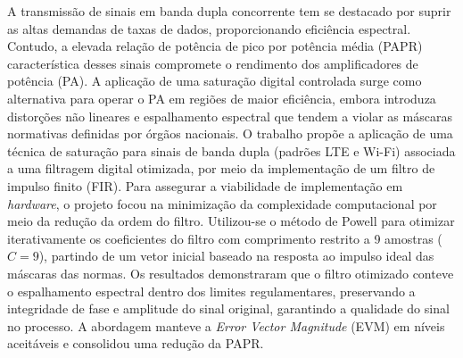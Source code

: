 A transmissão de sinais em banda dupla concorrente tem se destacado por suprir as altas demandas de taxas de dados, proporcionando eficiência espectral. Contudo, a elevada relação de potência de pico por potência média (PAPR) característica desses sinais compromete o rendimento dos amplificadores de potência (PA). A aplicação de uma saturação digital controlada surge como alternativa para operar o PA em regiões de maior eficiência, embora introduza distorções não lineares e espalhamento espectral que tendem a violar as máscaras normativas definidas por órgãos nacionais. O trabalho propõe a aplicação de uma técnica de saturação para sinais de banda dupla (padrões LTE e Wi-Fi) associada a uma filtragem digital otimizada, por meio da implementação de um filtro de impulso finito (FIR). Para assegurar a viabilidade de implementação em \textit{hardware}, o projeto focou na minimização da complexidade computacional por meio da redução da ordem do filtro. Utilizou-se o método de Powell para otimizar iterativamente os coeficientes do filtro com comprimento restrito a 9 amostras ($C=9$), partindo de um vetor inicial baseado na resposta ao impulso ideal das máscaras das normas. Os resultados demonstraram que o filtro otimizado conteve o espalhamento espectral dentro dos limites regulamentares, preservando a integridade de fase e amplitude do sinal original, garantindo a qualidade do sinal no processo. A abordagem manteve a \textit{Error Vector Magnitude} (EVM) em níveis aceitáveis e consolidou uma redução da PAPR.
	
